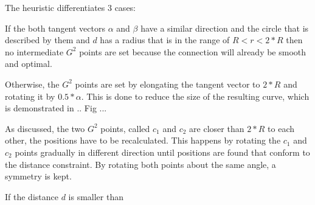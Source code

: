 The heuristic differentiates 3 cases:

If the both tangent vectors $\alpha$ and $\beta$ have a similar direction and the circle that is described by them and $d$ has a radius that is in the range of $R < r < 2*R$ then no intermediate $G^2$ points are set because the connection will already be smooth and optimal.

Otherwise, the $G^2$ points are set by elongating the tangent vector to $2*R$ and rotating it by $0.5 * \alpha$. This is done to reduce the size of the resulting curve, which is demonstrated in .. Fig ...

As discussed, the two $G^2$ points, called $c_1$ and $c_2$ are closer than $2 * R$ to each other, the positions have to be recalculated. This happens by rotating the $c_1$ and $c_2$ points gradually in different direction until positions are found that conform to the distance constraint. By rotating both points about the same angle, a symmetry is kept.

If the distance $d$ is smaller than 

